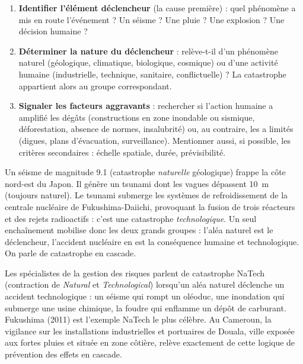 \documentclass[11pt]{article}
\newcommand{\cle}[1]{{\popxbold\color{popdark}#1}}
\begin{document}
\begin{methode}
\begin{enumerate}
\item \textbf{Identifier l'élément déclencheur} (la cause première) : quel phénomène a mis en route l'événement ? Un séisme ? Une pluie ? Une explosion ? Une décision humaine ?
\item \textbf{Déterminer la nature du déclencheur} : relève-t-il d'un phénomène naturel (géologique, climatique, biologique, cosmique) ou d'une activité humaine (industrielle, technique, sanitaire, conflictuelle) ? La catastrophe appartient alors au groupe correspondant.
\item \textbf{Signaler les facteurs aggravants} : rechercher si l'action humaine a amplifié les dégâts (constructions en zone inondable ou sismique, déforestation, absence de normes, insalubrité) ou, au contraire, les a limités (digues, plans d'évacuation, surveillance). Mentionner aussi, si possible, les critères secondaires : échelle spatiale, durée, prévisibilité.
\end{enumerate}
\end{methode}

\begin{exemplebox}
Un séisme de magnitude \num{9,1} (catastrophe \emph{naturelle} géologique) frappe la côte nord-est du Japon. Il génère un tsunami dont les vagues dépassent \SI{10}{m} (toujours naturel). Le tsunami submerge les systèmes de refroidissement de la centrale nucléaire de Fukushima-Daiichi, provoquant la fusion de trois réacteurs et des rejets radioactifs : c'est une catastrophe \emph{technologique}. Un seul enchaînement mobilise donc les deux grands groupes : l'aléa naturel est le déclencheur, l'accident nucléaire en est la conséquence humaine et technologique. On parle de \cle{catastrophe en cascade}.
\end{exemplebox}

\begin{savaistu}
Les spécialistes de la gestion des risques parlent de catastrophe \cle{NaTech} (contraction de \emph{Natural} et \emph{Technological}) lorsqu'un aléa naturel déclenche un accident technologique : un séisme qui rompt un oléoduc, une inondation qui submerge une usine chimique, la foudre qui enflamme un dépôt de carburant. Fukushima (2011) est l'exemple NaTech le plus célèbre. Au Cameroun, la vigilance sur les installations industrielles et portuaires de Douala, ville exposée aux fortes pluies et située en zone côtière, relève exactement de cette logique de prévention des effets en cascade.
\end{savaistu}
\end{document}
